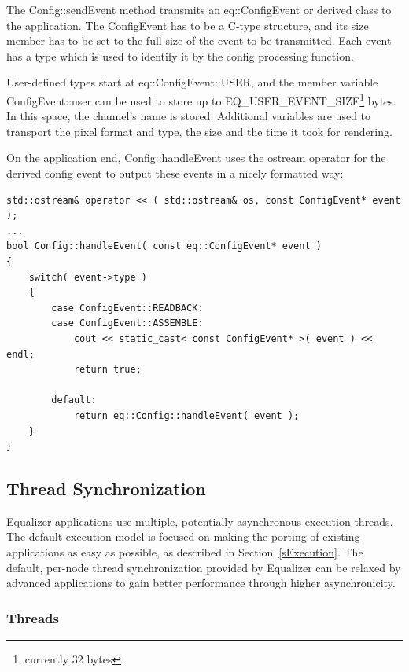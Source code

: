\documentclass[10pt,a4]{scrartcl}
\newcommand{\sref}[1]{Section~\ref{#1}}
\begin{document}
The \textsf{Config::sendEvent} method transmits an
\textsf{eq::ConfigEvent} or derived class to the application. The
ConfigEvent has to be a C-type structure, and its \textsf{size}
member has to be set to the full size of the event to be transmitted.
Each event has a type which is used to identify it by the config 
processing function.

User-defined types start at \textsf{eq::ConfigEvent::USER}, and the
member variable \textsf{ConfigEvent::user} can be used to store up to
\textsf{EQ\_USER\_EVENT\_SIZE}\footnote{currently 32 bytes} bytes. In
this space, the channel's name is stored. Additional variables are used
to transport the pixel format and type, the size and the time it took
for rendering.

On the application end, \textsf{Config::handleEvent} uses the
\textsf{ostream} operator for the derived config event to output these
events in a nicely formatted way:

{\footnotesize\begin{lstlisting}
std::ostream& operator << ( std::ostream& os, const ConfigEvent* event );
...
bool Config::handleEvent( const eq::ConfigEvent* event )
{
    switch( event->type )
    {
        case ConfigEvent::READBACK:
        case ConfigEvent::ASSEMBLE:
            cout << static_cast< const ConfigEvent* >( event ) << endl;
            return true;

        default:
            return eq::Config::handleEvent( event );
    }
}
\end{lstlisting}}%


\subsection{\label{sThreads}Thread Synchronization}

Equalizer applications use multiple, potentially asynchronous execution
threads. The default execution model is focused on making the porting of
existing applications as easy as possible, as described in
\sref{sExecution}. The default, per-node thread synchronization provided
by Equalizer can be relaxed by advanced applications to gain better
performance through higher asynchronicity.

\subsubsection{Threads}
\end{document}
